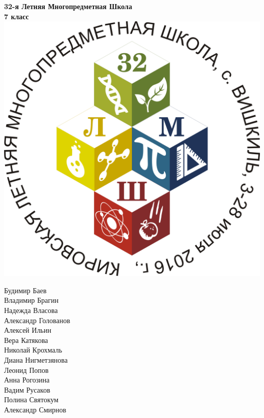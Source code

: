 \documentclass[10pt]{book}
\begin{document}
\begin{center}
	\Huge{\bf 32-я Летняя Многопредметная Школа}\\
	\Large{\bf 7 класс}\\ \vspace{.3cm}
	\includegraphics[width=\textwidth]{logo}
	\begin{multicols}{2}
		Будимир Баев \\
		Владимир Брагин \\
		Надежда Власова \\
		Александр Голованов \\
		Алексей Ильин \\
		Вера Катякова \\
		Николай Крохмаль \\
		Диана Нигметзянова \\
		Леонид Попов \\
		Анна Рогозина \\
		Вадим Русаков \\
		Полина Святокум \\
		Александр Смирнов \\
	\end{multicols}
\end{center}

\newpage
\end{document}
